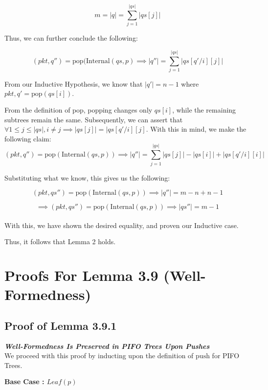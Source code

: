 \documentclass{article}
\begin{document}
$$m = |q| = \sum_{j=1}^{|qs|} |qs[j]|$$

\noindent Thus, we can further conclude the following:

$$(pkt, q'') = \text{pop}(\text{Internal}(qs, p) \implies |q''| = \sum_{j=1}^{|qs|} |qs[q'/i][j]|$$

\noindent From our Inductive Hypothesis, we know that $|q'| = n-1$ where $pkt, q' = \text{pop}(qs[i])$.\newline

\noindent From the definition of $\text{pop}$, popping changes only $qs[i]$, while the remaining subtrees remain the same. Subsequently, we can assert that $\forall 
1 \leq j \leq |qs|, i \neq j \implies |qs[j]| = |qs[q'/i][j]$. With this in mind, we make the following claim:\\[-15pt]

$$(pkt, q'') = \text{pop}(\text{Internal}(qs, p)) \implies |q''| = \sum_{j=1}^{|qs|} |qs[j]| - |qs[i]| + |qs[q'/i][i]|$$

\noindent Substituting what we know, this gives us the following:

$$(pkt, qs'') = \text{pop}(\text{Internal}(qs, p)) \implies |q''| = m - n + n - 1$$

$$\implies (pkt, qs'') = \text{pop}(\text{Internal}(qs, p)) \implies |qs''| = m - 1$$\\[-15pt]

\noindent With this, we have shown the desired equality, and proven our Inductive case.\newline

\noindent Thus, it follows that Lemma 2 holds.\newline


\section{Proofs For Lemma 3.9 (Well-Formedness)}

\subsection{Proof of Lemma 3.9.1}
\noindent \textit{\textbf{Well-Formedness Is Preserved in PIFO Trees Upon Pushes}}\\[10pt]

\noindent We proceed with this proof by inducting upon the definition of $\text{push}$ for PIFO Trees.\newline

\noindent \textbf{Base Case : $Leaf(p)$}\newline
\end{document}

